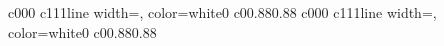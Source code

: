 \documentclass{standalone}
\begin{document}
\begin{knitdiagram}
{c}{0}{0}{0}
{c}{1}{1}{1}{line width=\outlineThickness*\dx, color=white}{0}
{c}{0}{0.88}{0.88}
{c}{0}{0}{0}
{c}{1}{1}{1}{line width=\outlineThickness*\dx, color=white}{0}
{c}{0}{0.88}{0.88}
\end{knitdiagram}
\end{document}
